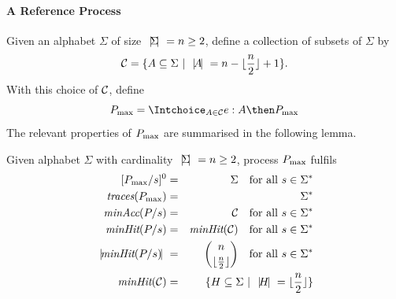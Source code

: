 \paragraph{A Reference Process} Given an alphabet $\Sigma$ of size ${~|\! \Sigma\!|~} =
n\ge 2$, define a collection of subsets of $\Sigma$ by
\begin{equation}\label{eq:defC}
  {\cal C} = \{ A\subseteq\Sigma~|~{~|\! A\!|~} = n - \lfloor\frac{n}{2}\rfloor + 1 \}.
\end{equation}
%
With this choice of ${\cal C}$, define
\begin{equation}\label{eq:pmax}
  \pmax = \Intchoice_{A\in{\cal C}} e:A\then \pmax
\end{equation}
%
The relevant properties of $P_\text{max}$ are summarised in the following lemma.
%
\begin{lemma}\label{lemma:pmax}
  Given alphabet $\Sigma$ with cardinality ${~|\! \Sigma\!|~} = n\ge 2$,
  process $P_\text{max}$ fulfils
  \begin{eqnarray}
  {}[P_\text{max}/s]^0 & = & \Sigma \quad\text{for all $s\in \Sigma^*$}
  \label{eq:pmaxa}
  \\
  \text{\it traces}(P_\text{max}) & = & \Sigma^*
  \label{eq:pmaxb}
  \\
  \text{\it minAcc}(P/s) & = & {\cal C} \quad\text{for all $s\in \Sigma^*$}
  \label{eq:pmaxc}
  \\
  \text{\it minHit}(P/s) & = & \text{\it minHit}({\cal C}) \quad\text{for all $s\in \Sigma^*$}
  \label{eq:pmaxe}
  \\
  {~|\! \text{\it minHit}(P/s)\!|~} & = & \binom{n}{\lfloor\frac{n}{2}\rfloor}
  \quad \text{for all $s\in \Sigma^*$}
  \label{eq:pmaxd}
  \\
  \text{\it minHit}({\cal C})  & = & \{ H\subseteq \Sigma~|~{~|\! H\!|~} = \lfloor\frac{n}{2}\rfloor\}
  \label{eq:pmaxf}
  \end{eqnarray}
\end{lemma}
